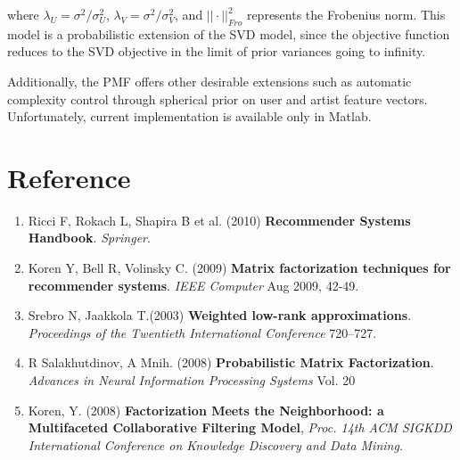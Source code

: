 \documentclass[11pt]{article}
\theoremstyle{definition}
\begin{document}
where $\lambda_U = \sigma^2 / \sigma_U^2$, $\lambda_V = \sigma^2 / \sigma_V^2$, and $||\cdot||_{Fro}^2$ represents the Frobenius norm. This model is a probabilistic extension of the SVD model, since the objective function reduces to the SVD objective in the limit of prior variances going to infinity.

Additionally, the PMF offers other desirable extensions such as automatic complexity control through spherical prior on user and artist feature vectors. Unfortunately, current implementation is available only in Matlab.


\newpage
\section*{\textbf{Reference}}
\begin{enumerate}
\item \label{ref:handbook}
Ricci F, Rokach L, Shapira B et al. (2010) \textbf{Recommender Systems Handbook}. \textit{Springer}. 
\item \label{ref:MFieee}
Koren Y, Bell R, Volinsky C. (2009) \textbf{Matrix factorization techniques for recommender systems}. \textit{IEEE Computer} Aug 2009, 42-49. 
\item \label{ref:WLA}
Srebro N,  Jaakkola T.(2003) \textbf{Weighted low-rank approximations}. \textit{Proceedings of the Twentieth International Conference} 720–727.
\item \label{ref:PMF}
R Salakhutdinov, A Mnih. (2008) \textbf{Probabilistic Matrix Factorization}. \textit{Advances in Neural Information Processing Systems} Vol. 20

\item \label{ref:implicit}
Koren, Y. (2008) \textbf{Factorization Meets the Neighborhood: a Multifaceted Collaborative Filtering Model}, \textit{Proc. 14th ACM SIGKDD International Conference on Knowledge Discovery and
Data Mining}.

\end{enumerate}
\end{document}
